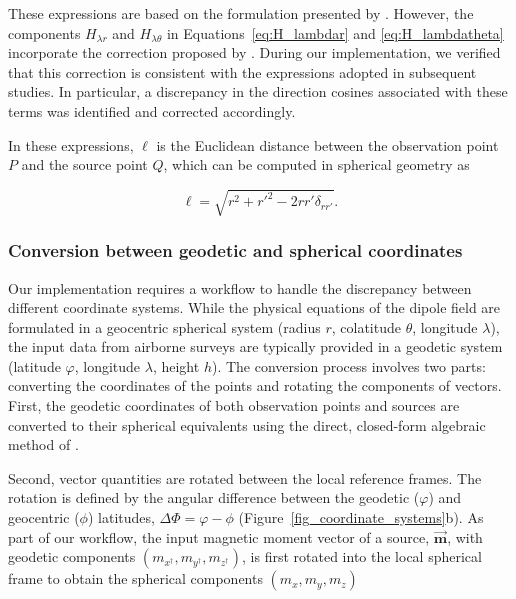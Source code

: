 \documentclass[onecolumn,10pt,a4paper]{article}
\begin{document}

These expressions are based on the formulation presented by \citet[see Table 5.2]{Langel1998}.
However, the components
$H_{\lambda r}$ and $H_{\lambda \theta}$ in Equations~\ref{eq:H_lambdar} and \ref{eq:H_lambdatheta}
incorporate the correction proposed by \citet{Dyment1998}.
During our implementation, we verified that
this correction is consistent with the expressions adopted in
subsequent studies. In particular, a discrepancy in the direction
cosines associated with these terms was identified and corrected
accordingly.

In these expressions, $\ell$ is the Euclidean distance between the observation point $P$ and the
source point $Q$, which can be computed in spherical geometry as

\begin{equation}
    \ell = \sqrt{r^2 + r'^2 - 2 r r' \delta_{rr'}}.
\end{equation}

\subsubsection{Conversion between geodetic and spherical coordinates}

Our implementation requires a workflow to handle the discrepancy between different coordinate
systems. While the physical equations of the dipole field are formulated in a geocentric spherical
system (radius $r$, colatitude $\theta$, longitude $\lambda$), the input data from airborne surveys
are typically provided in a geodetic system (latitude $\varphi$, longitude $\lambda$, height $h$).
The conversion process involves two parts: converting the coordinates of the points and rotating the
components of vectors. First, the geodetic coordinates of both observation points and sources are
converted to their spherical equivalents using the direct, closed-form algebraic method of \citet{Vermeille2002}.

Second, vector quantities are rotated between the local reference frames. The rotation is defined by
the angular difference between the geodetic ($\varphi$) and geocentric ($\phi$) latitudes,
$\Delta\Phi = \varphi - \phi$ (Figure~\ref{fig_coordinate_systems}b). As part of our workflow, the
input magnetic moment vector of a source, $\vec{\mathbf{m}}$, with geodetic components $(m_{x^{\dagger}}, m_{y^{\dagger}}, m_{z^{\dagger}})$,
is first rotated into the local spherical frame to obtain the spherical components $(m_x, m_y, m_z)$
\end{document}
